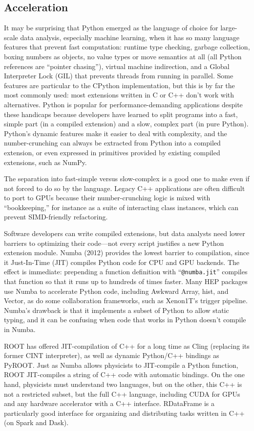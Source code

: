 \documentclass{article}
\begin{document}
\subsection{Acceleration}

It may be surprising that Python emerged as the language of choice for large-scale data analysis, especially machine learning, when it has so many language features that prevent fast computation: runtime type checking, garbage collection, boxing numbers as objects, no value types or move semantics at all (all Python references are ``pointer chasing''), virtual machine indirection, and a Global Interpreter Lock (GIL) that prevents threads from running in parallel. Some features are particular to the CPython implementation, but this is by far the most commonly used: most extensions written in C or C++ don't work with alternatives. Python is popular for performance-demanding applications despite these handicaps because developers have learned to split programs into a fast, simple part (in a compiled extension) and a slow, complex part (in pure Python). Python's dynamic features make it easier to deal with complexity, and the number-crunching can always be extracted from Python into a compiled extension, or even expressed in primitives provided by existing compiled extensions, such as NumPy.

The separation into fast-simple versus slow-complex is a good one to make even if not forced to do so by the language. Legacy C++ applications are often difficult to port to GPUs because their number-crunching logic is mixed with ``bookkeeping,'' for instance as a suite of interacting class instances, which can prevent SIMD-friendly refactoring.

Software developers can write compiled extensions, but data analysts need lower barriers to optimizing their code---not every script justifies a new Python extension module. Numba (2012) provides the lowest barrier to compilation, since it Just-In-Time (JIT) compiles Python code for CPU and GPU backends. The effect is immediate: prepending a function definition with ``{\tt @numba.jit}'' compiles that function so that it runs up to hundreds of times faster. Many HEP packages use Numba to accelerate Python code, including Awkward Array, hist, and Vector, as do some collaboration frameworks, such as Xenon1T's trigger pipeline. Numba's drawback is that it implements a subset of Python to allow static typing, and it can be confusing when code that works in Python doesn't compile in Numba.

ROOT has offered JIT-compilation of C++ for a long time as Cling (replacing its former CINT interpreter), as well as dynamic Python/C++ bindings as PyROOT. Just as Numba allows physicists to JIT-compile a Python function, ROOT JIT-compiles a string of C++ code with automatic bindings. On the one hand, physicists must understand two languages, but on the other, this C++ is not a restricted subset, but the full C++ language, including CUDA for GPUs and any hardware accelerator with a C++ interface. RDataFrame is a particularly good interface for organizing and distributing tasks written in C++ (on Spark and Dask).
\end{document}
